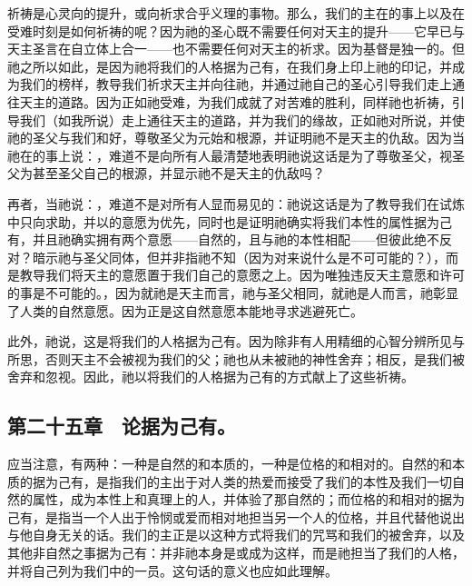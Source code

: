 祈祷是心灵向的提升，或向祈求合乎义理的事物。那么，我们的主在的事上以及在受难时刻是如何祈祷的呢？因为祂的圣心既不需要任何对天主的提升——它早已与天主圣言在自立体上合一——也不需要任何对天主的祈求。因为基督是独一的。但祂之所以如此，是因为祂将我们的人格据为己有，在我们身上印上祂的印记，并成为我们的榜样，教导我们祈求天主并向往祂，并通过祂自己的圣心引导我们走上通往天主的道路。因为正如祂受难，为我们成就了对苦难的胜利，同样祂也祈祷，引导我们（如我所说）走上通往天主的道路，并为我们的缘故，正如祂对所说，并使祂的圣父与我们和好，尊敬圣父为元始和根源，并证明祂不是天主的仇敌。因为当祂在的事上说：，难道不是向所有人最清楚地表明祂说这话是为了尊敬圣父，视圣父为甚至圣父自己的根源，并显示祂不是天主的仇敌吗？\par

再者，当祂说：，难道不是对所有人显而易见的：祂说这话是为了教导我们在试炼中只向求助，并以的意愿为优先，同时也是证明祂确实将我们本性的属性据为己有，并且祂确实拥有两个意愿——自然的，且与祂的本性相配——但彼此绝不反对？暗示祂与圣父同体，但并非指祂不知（因为对来说什么是不可可能的？），而是教导我们将天主的意愿置于我们自己的意愿之上。因为唯独违反天主意愿和许可的事是不可能的。，因为就祂是天主而言，祂与圣父相同，就祂是人而言，祂彰显了人类的自然意愿。因为正是这自然意愿本能地寻求逃避死亡。\par

此外，祂说，这是将我们的人格据为己有。因为除非有人用精细的心智分辨所见与所思，否则天主不会被视为我们的父；祂也从未被祂的神性舍弃；相反，是我们被舍弃和忽视。因此，祂以将我们的人格据为己有的方式献上了这些祈祷。\par


\subsection{第二十五章　论据为己有。}

应当注意，有两种：一种是自然的和本质的，一种是位格的和相对的。自然的和本质的据为己有，是指我们的主出于对人类的热爱而接受了我们的本性及我们一切自然的属性，成为本性上和真理上的人，并体验了那自然的；而位格的和相对的据为己有，是指当一个人出于怜悯或爱而相对地担当另一个人的位格，并且代替他说出与他自身无关的话。我们的主正是以这种方式将我们的咒骂和我们的被舍弃，以及其他非自然之事据为己有：并非祂本身是或成为这样，而是祂担当了我们的人格，并将自己列为我们中的一员。这句话的意义也应如此理解。\par

